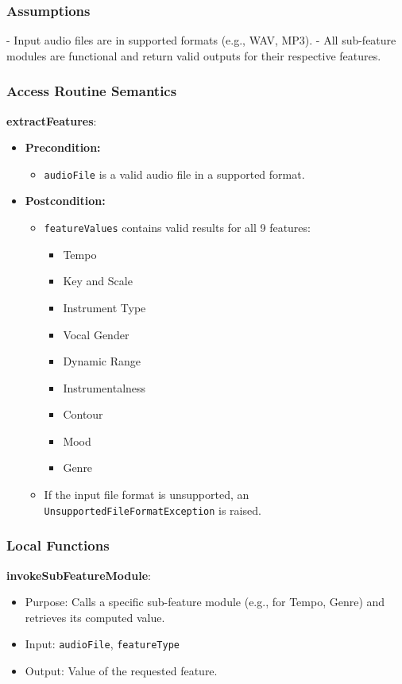 \documentclass[12pt, titlepage]{article}
\begin{document}
\subsubsection{Assumptions}
- Input audio files are in supported formats (e.g., WAV, MP3).
- All sub-feature modules are functional and return valid outputs for their respective features.

\subsubsection{Access Routine Semantics}
\textbf{extractFeatures}:
\begin{itemize}
    \item \textbf{Precondition:} 
    \begin{itemize}
        \item \texttt{audioFile} is a valid audio file in a supported format.
    \end{itemize}
    \item \textbf{Postcondition:}
    \begin{itemize}
        \item \texttt{featureValues} contains valid results for all 9 features:
            \begin{itemize}
                \item Tempo
                \item Key and Scale
                \item Instrument Type
                \item Vocal Gender
                \item Dynamic Range
                \item Instrumentalness
                \item Contour
                \item Mood
                \item Genre
            \end{itemize}
        \item If the input file format is unsupported, an \texttt{UnsupportedFileFormatException} is raised.
    \end{itemize}
\end{itemize}

\subsubsection{Local Functions}
\textbf{invokeSubFeatureModule}:
\begin{itemize}
    \item Purpose: Calls a specific sub-feature module (e.g., for Tempo, Genre) and retrieves its computed value.
    \item Input: \texttt{audioFile}, \texttt{featureType}
    \item Output: Value of the requested feature.
\end{itemize}
\end{document}
